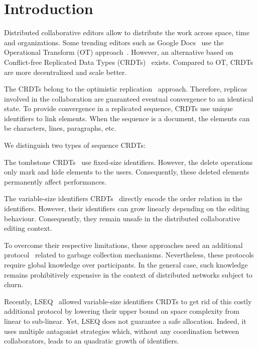
\section{Introduction}

Distributed collaborative editors allow to distribute the work across space,
time and organizations. Some trending editors such as Google
Docs~\cite{nichols1995high} use the Operational Transform (OT)
approach~\cite{sun1998operational,sun1998achieving}. However, an alternative
based on Conflict-free Replicated Data Types
(CRDTs)~\cite{shapiro2011comprehensive,shapiro2011conflict} exists.  Compared
to OT, CRDTs are more decentralized and scale better.

The CRDTs belong to the optimistic
replication~\cite{saito2002replication,saito2005optimistic}
approach. Therefore, replicas involved in the collaboration are guaranteed
eventual convergence to an identical state. To provide convergence in a
replicated sequence, CRDTs use unique identifiers to link elements. When the
sequence is a document, the elements can be characters, lines, paragraphs, etc.


We distinguish two types of sequence CRDTs:
\begin{inparaenum}[(i)]
\item The tombstone
  CRDTs~\cite{ahmed2011evaluating,grishchenko2010deep,oster2006data,preguica2009commutative,roh2011replicated,weiss2007wooki,wu2010partial,Yu2012stringwise}
  use fixed-size identifiers. However, the delete operations only mark and hide
  elements to the users. Consequently, these deleted elements permanently
  affect performances.
\item The variable-size identifiers
  CRDTs~\cite{preguica2009commutative,weiss2009logoot} directly encode the
  order relation in the identifiers. However, their identifiers can grow
  linearly depending on the editing behaviour. Consequently, they remain unsafe
  in the distributed collaborative editing context.
\end{inparaenum}

To overcome their respective limitations, these approaches need an additional
protocol~\cite{letia2009crdts,roh2011replicated} related to garbage collection
mechanisms. Nevertheless, these protocols require global knowledge over
participants. In the general case, such knowledge remains prohibitively
expensive in the context of distributed networks subject to churn.

Recently, LSEQ~\cite{nedelec2013lseq} allowed variable-size identifiers CRDTs
to get rid of this costly additional protocol by lowering their upper bound on
space complexity from linear to sub-linear. Yet, LSEQ does not guarantee a safe
allocation. Indeed, it uses multiple antagonist strategies which, without any
coordination between collaborators, leads to an quadratic growth of
identifiers.

